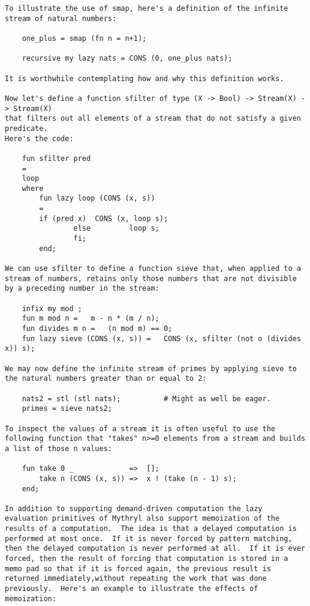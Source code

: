 \begin{verbatim}
To illustrate the use of smap, here's a definition of the infinite 
stream of natural numbers: 
 
    one_plus = smap (fn n = n+1);  
  
    recursive my lazy nats = CONS (0, one_plus nats); 
 
It is worthwhile contemplating how and why this definition works. 
 
Now let's define a function sfilter of type (X -> Bool) -> Stream(X) -> Stream(X) 
that filters out all elements of a stream that do not satisfy a given predicate. 
Here's the code: 
 
    fun sfilter pred 
	= 
	loop 
	where 
	    fun lazy loop (CONS (x, s)) 
		= 
		if (pred x)  CONS (x, loop s); 
                else         loop s; 
                fi; 
        end; 
  
We can use sfilter to define a function sieve that, when applied to a 
stream of numbers, retains only those numbers that are not divisible 
by a preceding number in the stream: 
 
    infix my mod ;  
    fun m mod n =   m - n * (m / n);  
    fun divides m n =   (n mod m) == 0;  
    fun lazy sieve (CONS (x, s)) =   CONS (x, sfilter (not o (divides x)) s);  
 
We may now define the infinite stream of primes by applying sieve to 
the natural numbers greater than or equal to 2: 
 
    nats2 = stl (stl nats);          # Might as well be eager.  
    primes = sieve nats2; 
 
To inspect the values of a stream it is often useful to use the 
following function that "takes" n>=0 elements from a stream and builds 
a list of those n values: 
 
    fun take 0 _             =>  []; 
        take n (CONS (x, s)) =>  x ! (take (n - 1) s); 
    end;  
 
In addition to supporting demand-driven computation the lazy 
evaluation primitives of Mythryl also support memoization of the 
results of a computation.  The idea is that a delayed computation is 
performed at most once.  If it is never forced by pattern matching, 
then the delayed computation is never performed at all.  If it is ever 
forced, then the result of forcing that computation is stored in a 
memo pad so that if it is forced again, the previous result is 
returned immediately,without repeating the work that was done 
previously.  Here's an example to illustrate the effects of 
memoization: 
 

\end{verbatim}
